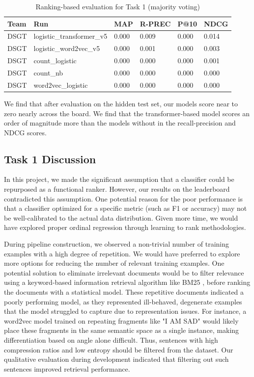 \documentclass[]{style/ceurart}
\begin{document}
\begin{table}[]
\caption{Ranking-based evaluation for Task 1 (majority voting)}
\begin{tabular}{llllll}
Team & Run                       & MAP   & R-PREC & P@10 & NDCG  \\
\toprule
DSGT & logistic\_transformer\_v5 & 0.000 & 0.009  & 0.000                             & 0.014 \\
DSGT & logistic\_word2vec\_v5    & 0.000 & 0.001  & 0.000                             & 0.003 \\
DSGT & count\_logistic           & 0.000 & 0.000  & 0.000                             & 0.001 \\
DSGT & count\_nb                 & 0.000 & 0.000  & 0.000                             & 0.000 \\
DSGT & word2vec\_logistic        & 0.000 & 0.000  & 0.000                             & 0.000
\end{tabular}
\end{table}



We find that after evaluation on the hidden test set, our models score near to zero nearly across the board. We find that the transformer-based model scores an order of magnitude more than the models without in the recall-precision and NDCG scores. 

\subsection{Task 1 Discussion}

In this project, we made the significant assumption that a classifier could be repurposed as a functional ranker. However, our results on the leaderboard contradicted this assumption. One potential reason for the poor performance is that a classifier optimized for a specific metric (such as F1 or accuracy) may not be well-calibrated to the actual data distribution. Given more time, we would have explored proper ordinal regression through learning to rank methodologies.

During pipeline construction, we observed a non-trivial number of training examples with a high degree of repetition. We would have preferred to explore more options for reducing the number of relevant training examples. One potential solution to eliminate irrelevant documents would be to filter relevance using a keyword-based information retrieval algorithm like BM25 \cite{robertson_probabilistic_2009}, before ranking the documents with a statistical model. These repetitive documents indicated a poorly performing model, as they represented ill-behaved, degenerate examples that the model struggled to capture due to representation issues. For instance, a word2vec model trained on repeating fragments like "I AM SAD" would likely place these fragments in the same semantic space as a single instance, making differentiation based on angle alone difficult. Thus, sentences with high compression ratios and low entropy should be filtered from the dataset. Our qualitative evaluation during development indicated that filtering out such sentences improved retrieval performance.
\end{document}
